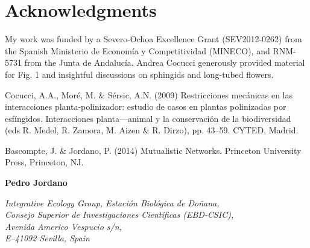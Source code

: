\documentclass[a4paper,12pt]{article}
\begin{document}
 


\section*{Acknowledgments}

My work was funded by a Severo-Ochoa Excellence Grant (SEV2012-0262) from the Spanish Ministerio de Econom\'ia y Competitividad (MINECO), and RNM-5731 from the Junta de Andaluc\'ia. Andrea Cocucci generously provided material for Fig. 1 and insightful discussions on sphingids and long-tubed flowers.

\newpage

% 

\begin{thebibliography}{10}

Cocucci, A.A., Mor\'e, M. \& S\'ersic, A.N. (2009) Restricciones mec\'anicas en las interacciones planta-polinizador: estudio de casos en plantas polinizadas por esf\'ingidos. Interacciones planta---animal y la conservaci\'on de la biodiversidad (eds R. Medel, R. Zamora, M. Aizen \& R. Dirzo), pp. 43–59. CYTED, Madrid.

Bascompte, J. \& Jordano, P. (2014) Mutualistic Networks. Princeton University Press, Princeton, NJ.

\end{thebibliography}


\begin{flushright}
  \noindent 
  		\textbf{Pedro Jordano }\\
  		\begin{spacing}{1.0}
		\textit{Integrative Ecology Group, Estaci\'on Biol\'ogica de Do\~nana, \\ Consejo Superior de Investigaciones Cient\'ificas (EBD-CSIC), \\ Avenida Americo Vespucio s\slash n, \\ E--41092 Sevilla, Spain}
		\end{spacing}
\end{flushright}
\newpage

\end{document}
